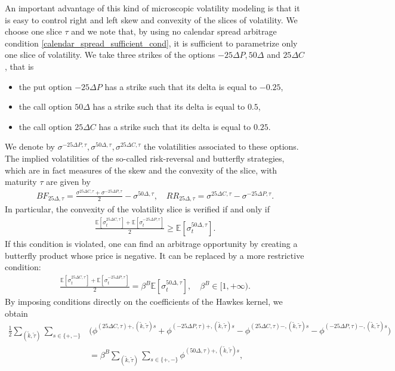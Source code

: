 \documentclass[12pt]{article}
\begin{document}
An important advantage of this kind of microscopic volatility modeling is that it is easy to control right and left skew and convexity of the slices of volatility. We choose one slice $\tau$ and we note that, by using no calendar spread arbitrage condition \eqref{calendar_spread_sufficient_cond}, it is sufficient to parametrize only one slice of volatility. We take three strikes of the options $-25\Delta P, 50\Delta$ and $25\Delta C$, that is
\begin{itemize}
    \item the put option $-25\Delta P$ has a strike such that its delta is equal to $-0.25$,
    \item the call option $50\Delta $ has a strike such that its delta is equal to $0.5$,
    \item the call option $25\Delta C$ has a strike such that its delta  is equal to $0.25$.
\end{itemize}
We denote by $\sigma^{-25\Delta P,\tau}, \sigma^{50\Delta, \tau}, \sigma^{25\Delta C, \tau}$ the volatilities associated to these options. The implied volatilities of the so-called risk-reversal and butterfly strategies, which are in fact measures of the skew and the convexity of the slice, with maturity $\tau$ are given by
\begin{align*}%
    BF_{25\Delta,\tau} = \frac{\sigma^{25\Delta C,\tau}+\sigma^{-25\Delta P,\tau}}{2}-\sigma^{50\Delta,\tau}, \quad RR_{25\Delta,\tau} = \sigma^{25\Delta C,\tau}- \sigma^{-25\Delta P,\tau}. 
\end{align*}
In particular, the convexity of the volatility slice is verified if and only if
\begin{align*}
    \frac{\mathbb{E}[\sigma_t^{25\Delta C,\tau}]+\mathbb{E}[\sigma_t^{-25\Delta P,\tau}]}{2}\geq \mathbb{E}[\sigma_t^{50\Delta,\tau}]. 
\end{align*}
If this condition is violated, one can find an arbitrage opportunity by creating a butterfly product whose price is negative. It can be replaced by a more restrictive condition:
\begin{align*}
    \frac{\mathbb{E}[\sigma_t^{25\Delta C,\tau}]+\mathbb{E}[\sigma_t^{-25\Delta P,\tau}]}{2} =  \beta^B\mathbb{E}[\sigma_t^{50\Delta,\tau}], \quad \beta^B \in [1,+\infty).
\end{align*}
By imposing conditions directly on the coefficients of the Hawkes kernel, we obtain 
\begin{align*}
     \frac{1}{2}\sum_{(\tilde k,\tilde \tau)}\sum_{s\in \{+,-\}}& \big(\phi^{(25\Delta C,\tau)+,(\tilde k,\tilde \tau)s} + \phi^{(-25\Delta P,\tau)+,(\tilde k,\tilde \tau)s}-\phi^{(25\Delta C,\tau)-,(\tilde k,\tilde \tau)s} - \phi^{(-25\Delta P,\tau)-,(\tilde k,\tilde \tau)s}\big) \\
     & = \beta^B \sum_{(\tilde k,\tilde \tau)}\sum_{s\in \{+,-\}} \phi^{(50\Delta ,\tau)+,(\tilde k,\tilde \tau)s}, \\
\end{align*}
\end{document}

